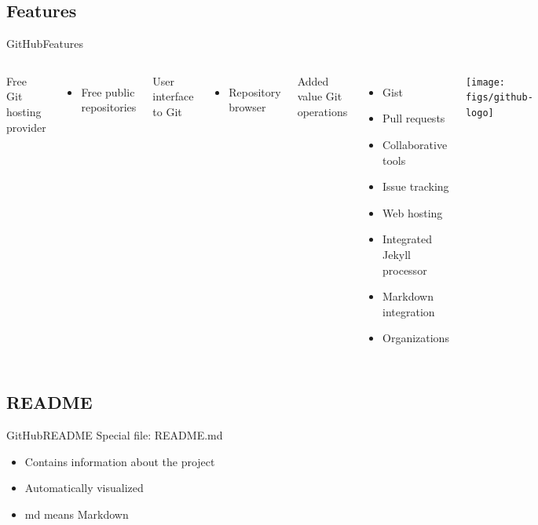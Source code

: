\documentclass[10pt,compress]{beamer} %
\begin{document}
\subsection{Features}
\begin{frame}{GitHub}{Features}
	\begin{columns}
		Free Git hosting provider
		\begin{itemize}
			\item Free public repositories
		\end{itemize}
		User interface to Git
		\begin{itemize}
			\item Repository browser
		\end{itemize}
		Added value Git operations
		\begin{itemize}
			\item Gist
			\item Pull requests	
			\item Collaborative tools
			\item Issue tracking
			\item Web hosting
			\item Integrated Jekyll processor
			\item Markdown integration
			\item Organizations
		\end{itemize}
	\begin{center}
 		\texttt{[image: figs/github-logo]}
	\end{center}
	\end{columns}
\end{frame}

\subsection{README}
\begin{frame}{GitHub}{README}
	Special file: README.md
	\begin{itemize}
		\item Contains information about the project
		\item Automatically visualized
		\item md means Markdown
	\end{itemize}
\end{frame}
\end{document}
